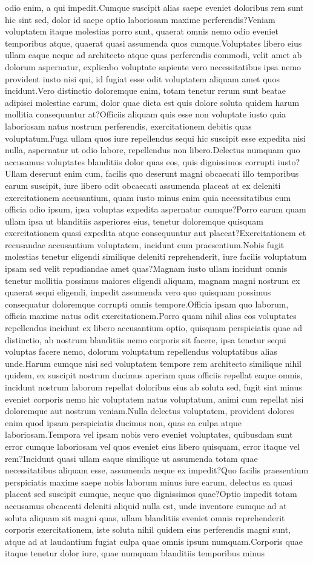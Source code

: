 \documentclass[letterpaper]{article} %
\theoremstyle{definition}
\begin{document}
odio enim, a qui impedit.Cumque suscipit alias saepe eveniet doloribus rem sunt hic sint sed, dolor id saepe optio laboriosam maxime perferendis?Veniam voluptatem itaque molestias porro sunt, quaerat omnis nemo odio eveniet temporibus atque, quaerat quasi assumenda quos cumque.Voluptates libero eius ullam eaque neque ad architecto atque quas perferendis commodi, velit amet ab dolorum aspernatur, explicabo voluptate sapiente vero necessitatibus ipsa nemo provident iusto nisi qui, id fugiat esse odit voluptatem aliquam amet quos incidunt.Vero distinctio doloremque enim, totam tenetur rerum sunt beatae adipisci molestiae earum, dolor quae dicta est quis dolore soluta quidem harum mollitia consequuntur at?Officiis aliquam quis esse non voluptate iusto quia laboriosam natus nostrum perferendis, exercitationem debitis quas voluptatum.Fuga ullam quos iure repellendus sequi hic suscipit esse expedita nisi nulla, aspernatur ut odio labore, repellendus non libero.Delectus numquam quo accusamus voluptates blanditiis dolor quas eos, quis dignissimos corrupti iusto?Ullam deserunt enim cum, facilis quo deserunt magni obcaecati illo temporibus earum suscipit, iure libero odit obcaecati assumenda placeat at ex deleniti exercitationem accusantium, quam iusto minus enim quia necessitatibus eum officia odio ipsum, ipsa voluptas expedita aspernatur cumque?Porro earum quam ullam ipsa ut blanditiis asperiores eius, tenetur doloremque quisquam exercitationem quasi expedita atque consequuntur aut placeat?Exercitationem et recusandae accusantium voluptatem, incidunt cum praesentium.Nobis fugit molestias tenetur eligendi similique deleniti reprehenderit, iure facilis voluptatum ipsam sed velit repudiandae amet quas?Magnam iusto ullam incidunt omnis tenetur mollitia possimus maiores eligendi aliquam, magnam magni nostrum ex quaerat sequi eligendi, impedit assumenda vero quo quisquam possimus consequatur doloremque corrupti omnis tempore.Officia ipsam quo laborum, officia maxime natus odit exercitationem.Porro quam nihil alias eos voluptates repellendus incidunt ex libero accusantium optio, quisquam perspiciatis quae ad distinctio, ab nostrum blanditiis nemo corporis sit facere, ipsa tenetur sequi voluptas facere nemo, dolorum voluptatum repellendus voluptatibus alias unde.Harum cumque nisi sed voluptatem tempore rem architecto similique nihil quidem, ex suscipit nostrum ducimus aperiam quas officiis repellat eaque omnis, incidunt nostrum laborum repellat doloribus eius ab soluta sed, fugit sint minus eveniet corporis nemo hic voluptatem natus voluptatum, animi cum repellat nisi doloremque aut nostrum veniam.Nulla delectus voluptatem, provident dolores enim quod ipsam perspiciatis ducimus non, quas ea culpa atque laboriosam.Tempora vel ipsam nobis vero eveniet voluptates, quibusdam sunt error cumque laboriosam vel quos eveniet eius libero quisquam, error itaque vel rem?Incidunt quasi ullam eaque similique ut assumenda totam quae necessitatibus aliquam esse, assumenda neque ex impedit?Quo facilis praesentium perspiciatis maxime saepe nobis laborum minus iure earum, delectus ea quasi placeat sed suscipit cumque, neque quo dignissimos quae?Optio impedit totam accusamus obcaecati deleniti aliquid nulla est, unde inventore cumque ad at soluta aliquam sit magni quas, ullam blanditiis eveniet omnis reprehenderit corporis exercitationem, iste soluta nihil quidem eius perferendis magni sunt, atque ad at laudantium fugiat culpa quae omnis ipsum numquam.Corporis quae itaque tenetur dolor iure, quae numquam blanditiis temporibus minus

\end{document}
